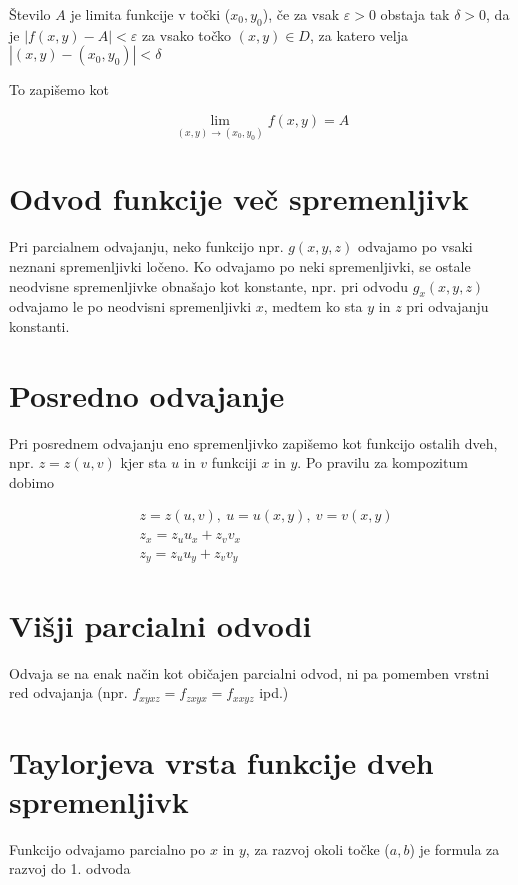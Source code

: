 \documentclass[12pt]{report}
\begin{document}
Število $A$ je limita funkcije v točki ($x_0, y_0$), če za vsak $\varepsilon>0$ obstaja tak $\delta>0$, da je $ |f(x,y)-A|< \varepsilon$ za vsako točko $(x,y) \in D$, za katero velja \\ $|(x,y)-(x_0,y_0)| < \delta$

To zapišemo kot 

\[\lim_{(x,y)\rightarrow(x_0,y_0)}f(x,y) = A\]



\section*{Odvod funkcije več spremenljivk}

Pri parcialnem odvajanju, neko funkcijo npr. $g(x,y,z)$ odvajamo po vsaki neznani spremenljivki ločeno. Ko odvajamo po neki spremenljivki, se ostale neodvisne spremenljivke obnašajo kot konstante, npr. pri odvodu $g_x(x,y,z)$ odvajamo le po neodvisni spremenljivki $x$, medtem ko sta $y$ in $z$ pri odvajanju konstanti.


\section*{Posredno odvajanje}

Pri posrednem odvajanju eno spremenljivko zapišemo kot funkcijo ostalih dveh, npr. $z=z(u,v)$ kjer sta $u$ in $v$ funkciji $x$ in $y$. Po pravilu za kompozitum dobimo


\begin{align*}
&z=z(u,v),\ u=u(x,y),\ v=v(x,y)\\
&z_x=z_uu_x+z_vv_x \\
& z_y=z_uu_y+z_vv_y
\end{align*}


\section*{Višji parcialni odvodi}
Odvaja se na enak način kot običajen parcialni odvod, ni pa pomemben vrstni red odvajanja (npr. $f_{xyxz} = f_{zxyx} = f_{xxyz}$ ipd.)


\section*{Taylorjeva vrsta funkcije dveh spremenljivk}

Funkcijo odvajamo parcialno po $x$ in $y$, za razvoj okoli točke ($a, b$) je formula za razvoj do 1. odvoda 
\end{document}
